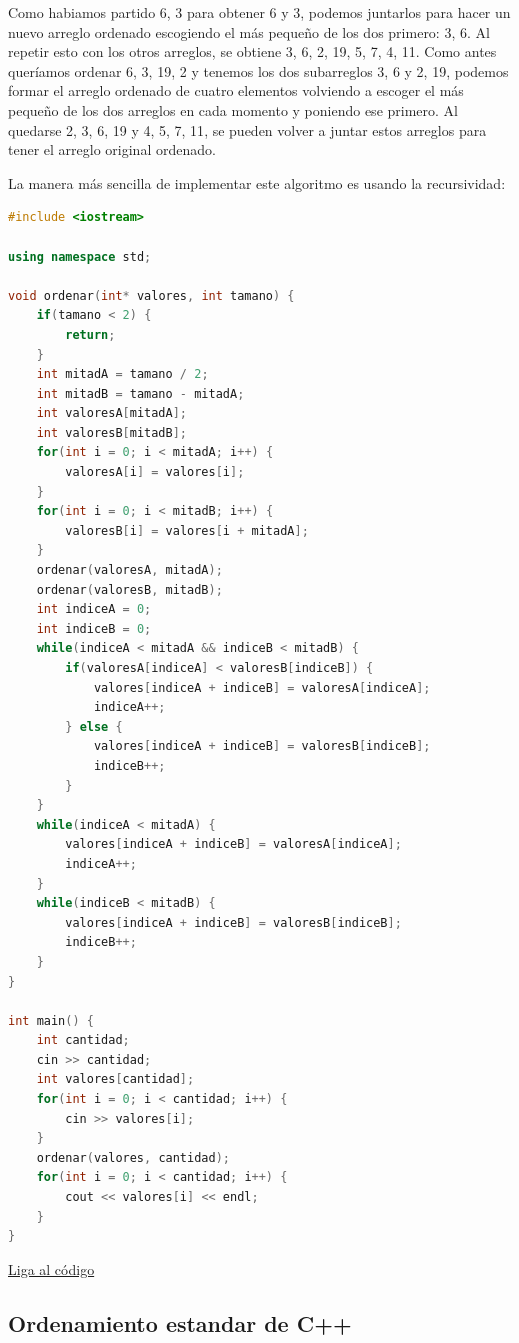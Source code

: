 \documentclass{article}
\begin{document}
Como habiamos partido {6, 3} para obtener {6} y {3}, podemos juntarlos para hacer un nuevo arreglo ordenado escogiendo el más pequeño de los dos primero: {3, 6}. Al repetir esto con los otros arreglos, se obtiene {3, 6}, {2, 19}, {5, 7}, {4, 11}. Como antes queríamos ordenar {6, 3, 19, 2} y tenemos los dos subarreglos {3, 6} y {2, 19}, podemos formar el arreglo ordenado de cuatro elementos volviendo a escoger el más pequeño de los dos arreglos en cada momento y poniendo ese primero. Al quedarse {2, 3, 6, 19} y {4, 5, 7, 11}, se pueden volver a juntar estos arreglos para tener el arreglo original ordenado.

La manera más sencilla de implementar este algoritmo es usando la recursividad:

\begin{lstlisting}[language=C++, caption=Ordenamiento por mezcla]
#include <iostream>

using namespace std;

void ordenar(int* valores, int tamano) {
    if(tamano < 2) {
        return;
    }
    int mitadA = tamano / 2;
    int mitadB = tamano - mitadA;
    int valoresA[mitadA];
    int valoresB[mitadB];
    for(int i = 0; i < mitadA; i++) {
        valoresA[i] = valores[i];
    }
    for(int i = 0; i < mitadB; i++) {
        valoresB[i] = valores[i + mitadA];
    }
    ordenar(valoresA, mitadA);
    ordenar(valoresB, mitadB);
    int indiceA = 0;
    int indiceB = 0;
    while(indiceA < mitadA && indiceB < mitadB) {
        if(valoresA[indiceA] < valoresB[indiceB]) {
            valores[indiceA + indiceB] = valoresA[indiceA];
            indiceA++;
        } else {
            valores[indiceA + indiceB] = valoresB[indiceB];
            indiceB++;
        }
    }
    while(indiceA < mitadA) {
        valores[indiceA + indiceB] = valoresA[indiceA];
        indiceA++;
    }
    while(indiceB < mitadB) {
        valores[indiceA + indiceB] = valoresB[indiceB];
        indiceB++;
    }
}

int main() {
    int cantidad;
    cin >> cantidad;
    int valores[cantidad];
    for(int i = 0; i < cantidad; i++) {
        cin >> valores[i];
    }
    ordenar(valores, cantidad);
    for(int i = 0; i < cantidad; i++) {
        cout << valores[i] << endl;
    }
}
\end{lstlisting}
\href{https://repl.it/@Jamesscn/Ordenamiento-de-mezcla}{Liga al código}

\subsection{Ordenamiento estandar de C++}
\end{document}
